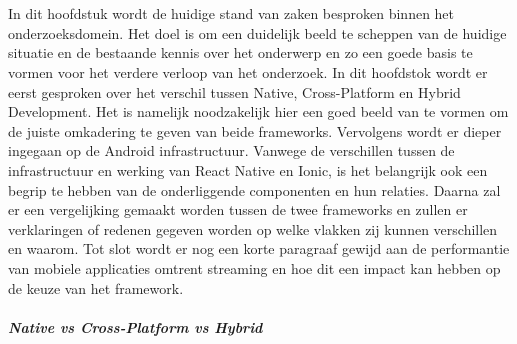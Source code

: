 \chapter{}%
\label{ch:stand-van-zaken}



In dit hoofdstuk wordt de huidige stand van zaken besproken binnen het onderzoeksdomein. Het doel is om een duidelijk beeld te scheppen van de huidige situatie en de bestaande kennis over het onderwerp en zo een goede basis te vormen voor het verdere verloop van het onderzoek. In dit hoofdstok wordt er eerst gesproken over het verschil tussen Native, Cross-Platform en Hybrid Development. Het is namelijk noodzakelijk hier een goed beeld van te vormen om de juiste omkadering te geven van beide frameworks. Vervolgens wordt er dieper ingegaan op de Android infrastructuur. Vanwege de verschillen tussen de infrastructuur en werking van React Native en Ionic, is het belangrijk ook een begrip te hebben van de onderliggende componenten en hun relaties. Daarna zal er een vergelijking gemaakt worden tussen de twee frameworks en zullen er verklaringen of redenen gegeven worden op welke vlakken zij kunnen verschillen en waarom. Tot slot wordt er nog een korte paragraaf gewijd aan de performantie van mobiele applicaties omtrent streaming en hoe dit een impact kan hebben op de keuze van het framework.

\paragraph{Native vs Cross-Platform vs Hybrid}

